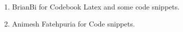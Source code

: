 \documentclass[12pt]{extarticle}
\begin{document}
\begin{multicols*}{2}
\begin{enumerate}
\item BrianBi for Codebook Latex and some code snippets.
\item Animesh Fatehpuria for Code snippets.
\end{enumerate}


% 

% 

% 

% 



% 




\end{multicols*}
\end{document}
